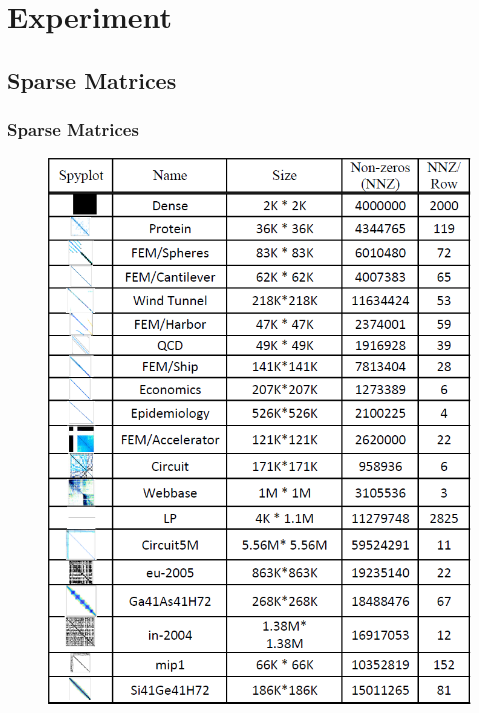 \section{Experiment}

\subsection{Sparse Matrices}
\begin{frame}
	\frametitle{Sparse Matrices}
	\begin{figure}
		\includegraphics[scale=0.25]{figure/fig5-kindmatrices.png}
	\end{figure}
\end{frame}

